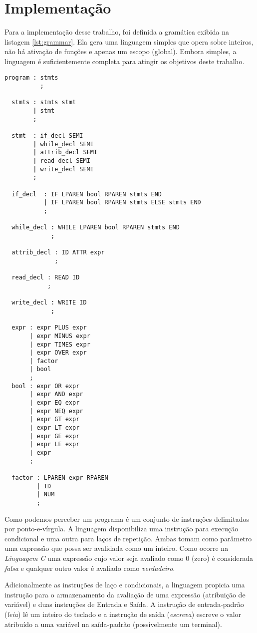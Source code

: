 \section{Implementação}
\label{sec:implementacao}

Para a implementação desse trabalho, foi definida a gramática exibida na
listagem \ref{lst:grammar}. Ela gera uma linguagem simples que opera sobre
inteiros, não há ativação de funções e apenas um escopo (global).
Embora simples, a linguagem é suficientemente completa para atingir os
objetivos deste trabalho.

\begin{lstlisting}[label=lst:grammar,caption=Gramática reconhecida]
  program : stmts
          ;

  stmts : stmts stmt
        | stmt
        ;

  stmt  : if_decl SEMI
        | while_decl SEMI
        | attrib_decl SEMI
        | read_decl SEMI
        | write_decl SEMI
        ;

  if_decl  : IF LPAREN bool RPAREN stmts END
           | IF LPAREN bool RPAREN stmts ELSE stmts END
           ;

  while_decl : WHILE LPAREN bool RPAREN stmts END
             ;

  attrib_decl : ID ATTR expr
              ;

  read_decl : READ ID
            ;

  write_decl : WRITE ID
             ;

  expr : expr PLUS expr
       | expr MINUS expr
       | expr TIMES expr
       | expr OVER expr
       | factor
       | bool
       ;
  bool : expr OR expr
       | expr AND expr
       | expr EQ expr
       | expr NEQ expr
       | expr GT expr
       | expr LT expr
       | expr GE expr
       | expr LE expr
       | expr
       ;

  factor : LPAREN expr RPAREN
         | ID
         | NUM
         ;
\end{lstlisting}

Como podemos perceber um programa é um conjunto de instruções delimitados por
ponto-e-vírgula. A linguagem disponibiliza uma instrução para execução
condicional e uma outra para laços de repetição. Ambas tomam como parâmetro
uma expressão que possa ser avalidada como um inteiro. Como ocorre na
\emph{Linguagem C} uma expressão cujo valor seja avaliado como 0 (zero) é
considerada \emph{falsa} e qualquer outro valor é avaliado como
\emph{verdadeiro}.

Adicionalmente as instruções de laço e condicionais, a linguagem propicia uma
instrução para o armazenamento da avaliação de uma expressão (atribuição de
variável) e duas instruções de Entrada e Saída. A instrução de entrada-padrão
(\emph{leia}) lê um inteiro do teclado e a instrução de saída (\emph{escreva})
escreve o valor atribuído a uma variável na saída-padrão (possivelmente um
terminal).

